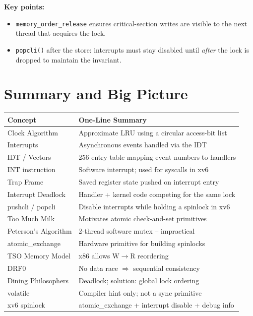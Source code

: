 \documentclass[11pt,a4paper]{article}
\newcommand{\code}[1]{\texttt{#1}}
\newcommand{\xv}{xv6}
\begin{document}
\textbf{Key points:}
\begin{itemize}
  \item \code{memory\_order\_release} ensures critical-section writes are
    visible to the next thread that acquires the lock.
  \item \code{popcli()} after the store: interrupts must stay disabled until
    \emph{after} the lock is dropped to maintain the invariant.
\end{itemize}

\section{Summary and Big Picture}

\begin{center}
\begin{tabular}{ll}
  \toprule
  \textbf{Concept} & \textbf{One-Line Summary} \\
  \midrule
  Clock Algorithm        & Approximate LRU using a circular access-bit list \\
  Interrupts             & Asynchronous events handled via the IDT \\
  IDT / Vectors          & 256-entry table mapping event numbers to handlers \\
  INT instruction        & Software interrupt; used for syscalls in \xv \\
  Trap Frame             & Saved register state pushed on interrupt entry \\
  Interrupt Deadlock     & Handler + kernel code competing for the same lock \\
  pushcli / popcli       & Disable interrupts while holding a spinlock in \xv \\
  Too Much Milk          & Motivates atomic check-and-set primitives \\
  Peterson's Algorithm   & 2-thread software mutex -- impractical \\
  atomic\_exchange       & Hardware primitive for building spinlocks \\
  TSO Memory Model       & x86 allows W$\to$R reordering \\
  DRF0                   & No data race $\Rightarrow$ sequential consistency \\
  Dining Philosophers    & Deadlock; solution: global lock ordering \\
  volatile               & Compiler hint only; not a sync primitive \\
  xv6 spinlock           & atomic\_exchange + interrupt disable + debug info \\
  \bottomrule
\end{tabular}
\end{center}
\end{document}
